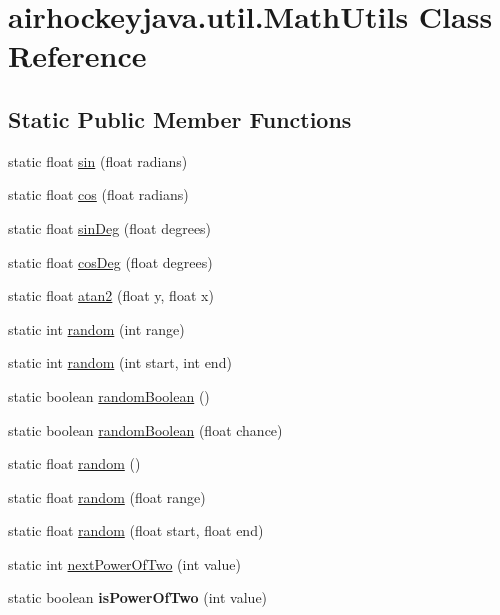 \hypertarget{classairhockeyjava_1_1util_1_1_math_utils}{}\section{airhockeyjava.\+util.\+Math\+Utils Class Reference}
\label{classairhockeyjava_1_1util_1_1_math_utils}
\subsection*{Static Public Member Functions}
\begin{DoxyCompactItemize}
\item 
static float \hyperlink{classairhockeyjava_1_1util_1_1_math_utils_a5d213330e4c07720a1b418e7850d16bd}{sin} (float radians)
\item 
static float \hyperlink{classairhockeyjava_1_1util_1_1_math_utils_a28f31e635ba0e591e77fc79a0549f26f}{cos} (float radians)
\item 
static float \hyperlink{classairhockeyjava_1_1util_1_1_math_utils_a8e2d50c2cf656073c72f3e1bd7a4d3b3}{sin\+Deg} (float degrees)
\item 
static float \hyperlink{classairhockeyjava_1_1util_1_1_math_utils_a569c42ca5210e84a2b90aa981ab36071}{cos\+Deg} (float degrees)
\item 
static float \hyperlink{classairhockeyjava_1_1util_1_1_math_utils_a3ac4b71018ca59f3efe78927bde47daa}{atan2} (float y, float x)
\item 
static int \hyperlink{classairhockeyjava_1_1util_1_1_math_utils_ae43178c7afcec931714e4cad7316565a}{random} (int range)
\item 
static int \hyperlink{classairhockeyjava_1_1util_1_1_math_utils_ab9b62e431e475ff3f7d19c1ec2755dc4}{random} (int start, int end)
\item 
static boolean \hyperlink{classairhockeyjava_1_1util_1_1_math_utils_ac186ad5b8aeb5cc89f9e32e0580f6541}{random\+Boolean} ()
\item 
static boolean \hyperlink{classairhockeyjava_1_1util_1_1_math_utils_add725793d3f469b31bac35fc60663f30}{random\+Boolean} (float chance)
\item 
static float \hyperlink{classairhockeyjava_1_1util_1_1_math_utils_a10df0e4cbd0255af56953d12fbe3d81d}{random} ()
\item 
static float \hyperlink{classairhockeyjava_1_1util_1_1_math_utils_a4a64f2d37523d4c2dfdc99afbe485360}{random} (float range)
\item 
static float \hyperlink{classairhockeyjava_1_1util_1_1_math_utils_af8167b8c8850cfae798d8a92da13d501}{random} (float start, float end)
\item 
static int \hyperlink{classairhockeyjava_1_1util_1_1_math_utils_a92e007a601431dc0ecdadcc679701586}{next\+Power\+Of\+Two} (int value)
\item 
\hypertarget{classairhockeyjava_1_1util_1_1_math_utils_ac8feff64c811bcbc1bc7eea47560cd6f}{}static boolean {\bfseries is\+Power\+Of\+Two} (int value)\label{classairhockeyjava_1_1util_1_1_math_utils_ac8feff64c811bcbc1bc7eea47560cd6f}


\end{DoxyCompactItemize}

